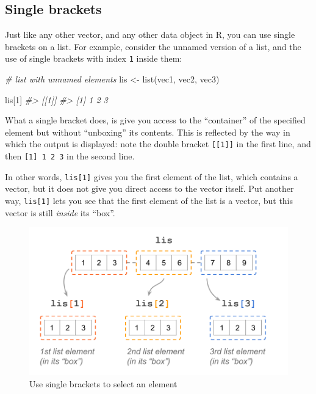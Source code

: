 \documentclass[
]{book}
\newenvironment{Shaded}{\begin{snugshade}}{\end{snugshade}}
\newcommand{\CommentTok}[1]{\textcolor[rgb]{0.56,0.35,0.01}{\textit{#1}}}
\newcommand{\DecValTok}[1]{\textcolor[rgb]{0.00,0.00,0.81}{#1}}
\newcommand{\FunctionTok}[1]{\textcolor[rgb]{0.00,0.00,0.00}{#1}}
\newcommand{\NormalTok}[1]{#1}
\newcommand{\OtherTok}[1]{\textcolor[rgb]{0.56,0.35,0.01}{#1}}
\begin{document}
\hypertarget{single-brackets}{%
\subsection{Single brackets}\label{single-brackets}}

Just like any other vector, and any other data object in R, you can use single
brackets on a list. For example, consider the unnamed version of a list, and
the use of single brackets with index \texttt{1} inside them:

\begin{Shaded}
\begin{Highlighting}[]
\CommentTok{\# list with unnamed elements}
\NormalTok{lis }\OtherTok{\textless{}{-}} \FunctionTok{list}\NormalTok{(vec1, vec2, vec3)}

\NormalTok{lis[}\DecValTok{1}\NormalTok{]}
\CommentTok{\#\textgreater{} [[1]]}
\CommentTok{\#\textgreater{} [1] 1 2 3}
\end{Highlighting}
\end{Shaded}

What a single bracket does, is give you access to the ``container'' of the
specified element but without ``unboxing'' its contents. This is reflected by
the way in which the output is displayed: note the double bracket \texttt{{[}{[}1{]}{]}} in
the first line, and then \texttt{{[}1{]}\ 1\ 2\ 3} in the second line.

In other words, \texttt{lis{[}1{]}} gives you the first element of the list, which
contains a vector, but it does not give you direct access to the vector itself.
Put another way, \texttt{lis{[}1{]}} lets you see that the first element of the list is
a vector, but this vector is still \emph{inside} its ``box''.

\begin{figure}

{\centering \includegraphics[width=0.75\linewidth]{images/objects/obj-list-brackets2} 

}

\caption{Use single brackets to select an element}\label{fig:unnamed-chunk-126}
\end{figure}
\end{document}
